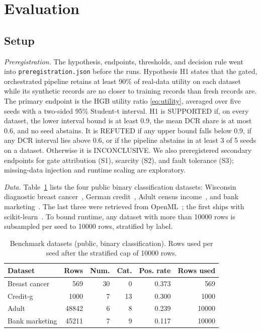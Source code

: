 \documentclass[journal]{IEEEtran}
\begin{document}
\section{Evaluation}
\label{sec:eval}

\subsection{Setup}
\emph{Preregistration.} The hypothesis, endpoints, thresholds, and decision rule went into \texttt{preregistration.json} before the runs. Hypothesis H1 states that the gated, orchestrated pipeline retains at least 90\% of real-data utility on each dataset while its synthetic records are no closer to training records than fresh records are. The primary endpoint is the HGB utility ratio \eqref{eq:utility}, averaged over five seeds with a two-sided 95\% Student-t interval. H1 is SUPPORTED if, on every dataset, the lower interval bound is at least 0.9, the mean DCR share is at most 0.6, and no seed abstains. It is REFUTED if any upper bound falls below 0.9, if any DCR interval lies above 0.6, or if the pipeline abstains in at least 3 of 5 seeds on a dataset. Otherwise it is INCONCLUSIVE. We also preregistered secondary endpoints for gate attribution (S1), scarcity (S2), and fault tolerance (S3); missing-data injection and runtime scaling are exploratory.

\emph{Data.} Table~\ref{tab:datasets} lists the four public binary classification datasets: Wisconsin diagnostic breast cancer~\cite{street1993nuclear}, German credit~\cite{hofmann1994statlog}, Adult census income~\cite{becker1996adult}, and bank marketing~\cite{moro2014bank}. The last three were retrieved from OpenML~\cite{vanschoren2014openml}; the first ships with scikit-learn~\cite{pedregosa2011scikit}. To bound runtime, any dataset with more than 10000 rows is subsampled per seed to 10000 rows, stratified by label.

\begin{table}[!t]
\caption{Benchmark datasets (public, binary classification). Rows used per seed after the stratified cap of 10000 rows.}
\label{tab:datasets}
\centering
\footnotesize
\setlength{\tabcolsep}{3pt}
\begin{tabular}{lrrrrr}
\toprule
Dataset & Rows & Num. & Cat. & Pos. rate & Rows used \\
\midrule
Breast cancer & 569 & 30 & 0 & 0.373 & 569 \\
Credit-g & 1000 & 7 & 13 & 0.300 & 1000 \\
Adult & 48842 & 6 & 8 & 0.239 & 10000 \\
Bank marketing & 45211 & 7 & 9 & 0.117 & 10000 \\
\bottomrule
\end{tabular}
\end{table}
\end{document}
